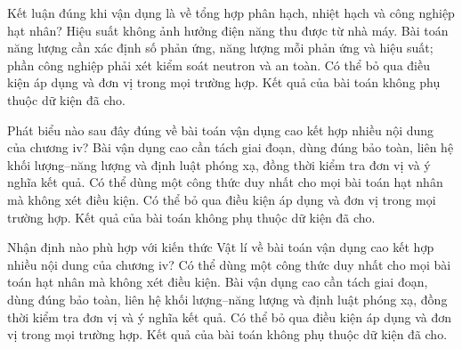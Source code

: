 \begin{ex}
Kết luận đúng khi vận dụng là về tổng hợp phân hạch, nhiệt hạch và công nghiệp hạt nhân?
\choice
{Hiệu suất không ảnh hưởng điện năng thu được từ nhà máy.}
{\True Bài toán năng lượng cần xác định số phản ứng, năng lượng mỗi phản ứng và hiệu suất; phần công nghiệp phải xét kiểm soát neutron và an toàn.}
{Có thể bỏ qua điều kiện áp dụng và đơn vị trong mọi trường hợp.}
{Kết quả của bài toán không phụ thuộc dữ kiện đã cho.}
\end{ex}

\begin{ex}
Phát biểu nào sau đây đúng về bài toán vận dụng cao kết hợp nhiều nội dung của chương iv?
\choice
{\True Bài vận dụng cao cần tách giai đoạn, dùng đúng bảo toàn, liên hệ khối lượng–năng lượng và định luật phóng xạ, đồng thời kiểm tra đơn vị và ý nghĩa kết quả.}
{Có thể dùng một công thức duy nhất cho mọi bài toán hạt nhân mà không xét điều kiện.}
{Có thể bỏ qua điều kiện áp dụng và đơn vị trong mọi trường hợp.}
{Kết quả của bài toán không phụ thuộc dữ kiện đã cho.}
\end{ex}

\begin{ex}
Nhận định nào phù hợp với kiến thức Vật lí về bài toán vận dụng cao kết hợp nhiều nội dung của chương iv?
\choice
{Có thể dùng một công thức duy nhất cho mọi bài toán hạt nhân mà không xét điều kiện.}
{\True Bài vận dụng cao cần tách giai đoạn, dùng đúng bảo toàn, liên hệ khối lượng–năng lượng và định luật phóng xạ, đồng thời kiểm tra đơn vị và ý nghĩa kết quả.}
{Có thể bỏ qua điều kiện áp dụng và đơn vị trong mọi trường hợp.}
{Kết quả của bài toán không phụ thuộc dữ kiện đã cho.}
\end{ex}

